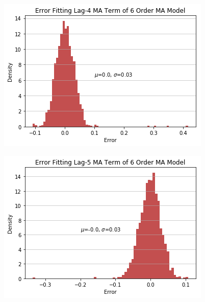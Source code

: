\documentclass[oneside,12pt,openany]{book}
\begin{document}
	\begin{figure}[!ht]
		\centering
		\includegraphics[width=.85\linewidth]{images/MA6ModelMA4CoefDist.png}
	\end{figure}
	\begin{figure}[!ht]
		\centering
		\includegraphics[width=.85\linewidth]{images/MA6ModelMA5CoefDist.png}
	\end{figure}
	
\end{document}

